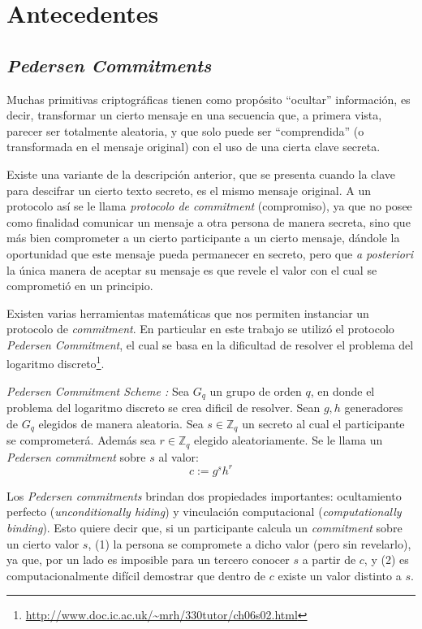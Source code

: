 \chapter{Antecedentes}
\section{\emph{Pedersen Commitments}}

Muchas primitivas criptográficas tienen como propósito ``ocultar'' información, es decir, transformar un cierto mensaje en una 
secuencia que, a primera vista, parecer ser totalmente aleatoria, y que solo puede ser ``comprendida'' (o transformada en el 
mensaje original) con el uso de una cierta clave secreta.

Existe una variante de la descripción anterior, que se presenta cuando la clave para descifrar un cierto texto secreto, es el 
mismo mensaje original. A un protocolo así se le llama \emph{protocolo de commitment} (compromiso), ya que no posee como finalidad 
comunicar un mensaje a otra persona de manera secreta, sino que más bien comprometer a un cierto participante a un cierto mensaje, 
dándole la oportunidad que este mensaje pueda permanecer en secreto, pero que \emph{a posteriori} la única manera de aceptar su 
mensaje es que revele el valor con el cual se comprometió en un principio.

Existen varias herramientas matemáticas que nos permiten instanciar un protocolo de \emph{commitment}. En particular en este 
trabajo se utilizó el protocolo \emph{Pedersen Commitment}\cite{pedersen1991non}, el cual se basa en la dificultad de resolver el 
problema del logaritmo discreto\footnote{\url{http://www.doc.ic.ac.uk/~mrh/330tutor/ch06s02.html}}.

\emph{Pedersen Commitment Scheme \cite{pedersen1991non}:} Sea $G_q$ un grupo de orden $q$, en donde el problema del logaritmo discreto se crea dificil 
de resolver. Sean $g,h$ generadores de $G_q$ elegidos de manera aleatoria. Sea $s \in \mathbb{Z}_q$ un secreto al cual el 
participante se comprometerá. Además sea $r \in \mathbb{Z}_q$ elegido aleatoriamente. Se le llama un \emph{Pedersen commitment} 
sobre $s$ al valor: $$c := g^s h^r$$

Los \emph{Pedersen commitments} brindan dos propiedades importantes: 
  ocultamiento perfecto (\emph{unconditionally hiding}) y 
  vinculación computacional (\emph{computationally binding}). 
Esto quiere decir que, si un participante calcula un \emph{commitment} sobre un 
  cierto valor $s$, 
  (1) la persona se compromete a dicho valor (pero sin revelarlo), ya que, 
  por un lado es imposible para un tercero conocer $s$ a partir de $c$, 
  y (2) es computacionalmente difícil demostrar que dentro de $c$ existe un valor distinto a $s$.


